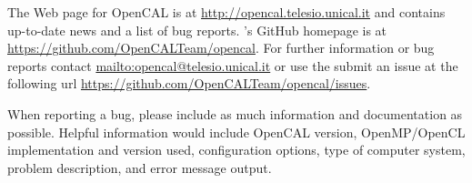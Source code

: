 The Web page for OpenCAL is at \url{http://opencal.telesio.unical.it} and
contains up-to-date news and a list of bug reports. \ocal's GitHub
homepage is at \url{https://github.com/OpenCALTeam/opencal}. For
further information or bug reports contact
\url{mailto:opencal@telesio.unical.it} or use the submit an issue at the
following url \url{https://github.com/OpenCALTeam/opencal/issues}.

When reporting a bug, please include as much information and
documentation as possible. Helpful information would include OpenCAL
version, OpenMP/OpenCL implementation and version used,
configuration options, type of computer system, problem description,
and error message output.
